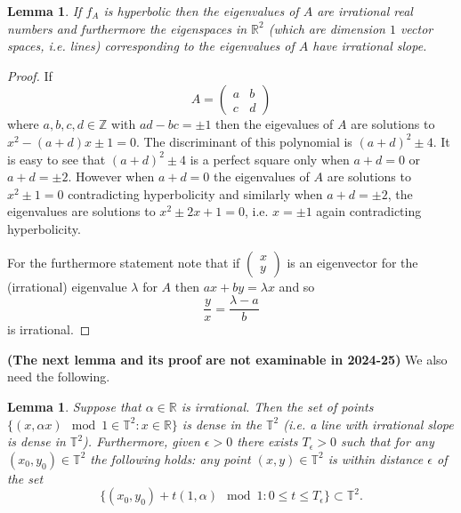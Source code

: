 \documentclass[12pt]{article}
\newtheorem{lemma}[theorem]{Lemma}
\theoremstyle{definition}
\theoremstyle{remark}
\begin{document}
\begin{lemma}
 If $f_A$ is hyperbolic then the eigenvalues of $A$ are irrational real numbers and furthermore the eigenspaces in $\mathbb{R}^2$ (which are dimension $1$ vector spaces, i.e. lines) corresponding to the eigenvalues of $A$ have irrational slope. 
\end{lemma}
\begin{proof}
If
\[
A = \begin{pmatrix}
a & b \\
c & d
\end{pmatrix}
\]
where $a,b,c,d \in \mathbb{Z}$ with $ad - bc = \pm 1$ then the eigevalues of $A$ are solutions to $x^2 - (a+d)x \pm 1 =0$. The discriminant of this polynomial is $(a+d)^2 \pm 4$. It is easy to see that $(a+d)^2 \pm 4$ is a perfect square only when $a + d =0$ or $a+d = \pm 2$. However when $a + d = 0$ the eigenvalues of $A$ are solutions to $x^2 \pm 1 = 0$ contradicting hyperbolicity and similarly when $a+d = \pm 2$, the eigenvalues are solutions to $x^2 \pm 2x + 1 =0$, i.e. $x=\pm 1$ again contradicting hyperbolicity. 

For the furthermore statement note that if $\begin{pmatrix} x \\ y \end{pmatrix}$ is an eigenvector for the (irrational) eigenvalue $\lambda$ for $A$ then $ax + by = \lambda x$ and so
\[
\frac{y}{x} = \frac{\lambda -a }{b}
\]
is irrational.
\end{proof}

\noindent
{\bf (The next lemma and its proof are not examinable in 2024-25)}
We also need the following.
\begin{lemma}
Suppose that $\alpha \in \mathbb{R}$ is irrational. Then the  set of points $\{(x,\alpha x) \mod 1 \in \mathbb{T}^2 : x \in \mathbb{R}\}$ is dense in the $\mathbb{T}^2$ (i.e. a line with irrational slope is dense in $\mathbb{T}^2$). Furthermore, given $\epsilon >0$ there exists $T_\epsilon >0$ such that for any $(x_0,y_0) \in \mathbb{T}^2$ the following holds: any point $(x,y) \in \mathbb{T}^2$ is within distance $\epsilon$ of the set
\[
\{ (x_0,y_0) + t(1,\alpha) \mod 1 : 0\le t \le T_\epsilon\} \subset \mathbb{T}^2.
\] 
\end{lemma}
\end{document}
